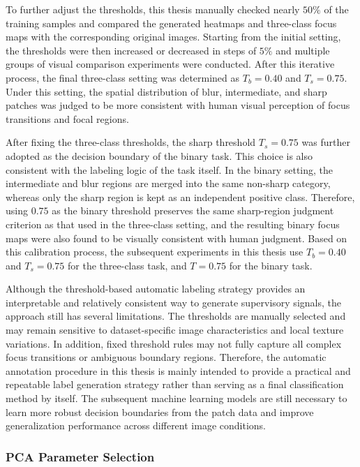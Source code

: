 \par To further adjust the thresholds, this thesis manually checked nearly
$50\%$ of the training samples and compared the generated heatmaps and
three-class focus maps with the corresponding original images. Starting from the
initial setting, the thresholds were then increased or decreased in steps of
$5\%$ and multiple groups of visual comparison experiments were conducted. After
this iterative process, the final three-class setting was determined as
$T_b=0.40$ and $T_s=0.75$. Under this setting, the spatial distribution of blur,
intermediate, and sharp patches was judged to be more consistent with human
visual perception of focus transitions and focal regions.

\par After fixing the three-class thresholds, the sharp threshold $T_s=0.75$ was
further adopted as the decision boundary of the binary task. This choice is also
consistent with the labeling logic of the task itself. In the binary setting,
the intermediate and blur regions are merged into the same non-sharp category,
whereas only the sharp region is kept as an independent positive class.
Therefore, using $0.75$ as the binary threshold preserves the same sharp-region
judgment criterion as that used in the three-class setting, and the resulting
binary focus maps were also found to be visually consistent with human judgment.
Based on this calibration process, the subsequent experiments in this thesis use
$T_b=0.40$ and $T_s=0.75$ for the three-class task, and $T=0.75$ for the binary
task.
\par Although the threshold-based automatic labeling strategy provides an
interpretable and relatively consistent way to generate supervisory signals,
the approach still has several limitations. The thresholds are manually selected
and may remain sensitive to dataset-specific image characteristics and local
texture variations. In addition, fixed threshold rules may not fully capture
all complex focus transitions or ambiguous boundary regions. Therefore, the
automatic annotation procedure in this thesis is mainly intended to provide a
practical and repeatable label generation strategy rather than serving as a
final classification method by itself. The subsequent machine learning models
are still necessary to learn more robust decision boundaries from the patch
data and improve generalization performance across different image conditions.

\subsubsection{PCA Parameter Selection}

